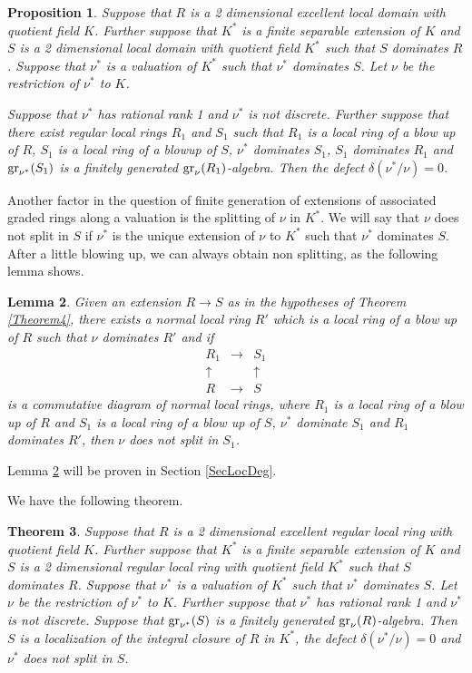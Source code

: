 \documentclass[11pt]{amsart}
\newtheorem{Theorem}{Theorem}[section]
\newtheorem{Lemma}[Theorem]{Lemma}
\newtheorem{Proposition}[Theorem]{Proposition}
\begin{document}
\begin{Proposition}\label{Prop1} 
Suppose that $R$ is a 2 dimensional excellent local domain with quotient field $K$. Further suppose that $K^*$ is a finite separable extension of $K$ and $S$ is a 2 dimensional local domain with quotient field
$K^*$ such that  $S$ dominates $R$. 
Suppose that $\nu^*$ is a valuation of $K^*$ such that 
 $\nu^*$ dominates $S$. Let $\nu$ be the restriction of $\nu^*$ to $K$. 
 
 Suppose that  $\nu^*$ has rational rank 1 and $\nu^*$ is not discrete. Further suppose that 
  there exist regular local rings $R_1$ and $S_1$ such that
 $R_1$ is a local ring of a blow up of $R$, $S_1$ is a local ring of a blowup of $S$, $\nu^*$ dominates $S_1$, $S_1$ dominates $R_1$ and ${\rm gr}_{\nu^*}(S_1)$ is a finitely generated ${\rm gr}_{\nu}(R_1)$-algebra.
Then the defect $\delta(\nu^*/\nu)=0$.
\end{Proposition}

Another factor in the question of finite generation of extensions of associated graded rings along a valuation is the splitting of $\nu$ in $K^*$. We will say that $\nu$ does not split in $S$ if $\nu^*$ is the unique extension of $\nu$ to $K^*$ such that $\nu^*$ dominates $S$.  After a little blowing up, we can always obtain non splitting, as the following lemma shows.

\begin{Lemma}\label{LemmaN66} Given an extension $R\rightarrow S$ as in the hypotheses  of Theorem \ref{Theorem4},  there exists a normal local ring $R'$ which is a local ring of a blow up of $R$ such that $\nu$ dominates $R'$ and if 
$$
\begin{array}{lll}
R_1&\rightarrow&S_1\\
\uparrow&&\uparrow\\
R&\rightarrow&S
\end{array}
$$
is a commutative diagram of normal local rings, where $R_1$ is a local ring of a blow up of $R$ and $S_1$ is a local ring of a blow up of $S$, $\nu^*$ dominate $S_1$ and $R_1$ dominates $R'$,  then $\nu$ does not split in $S_1$.
\end{Lemma}
Lemma \ref{LemmaN66} will be proven in Section \ref{SecLocDeg}.

We have the following theorem.

\begin{Theorem}\label{ThmN2}    Suppose that $R$ is a 2 dimensional excellent regular local ring with quotient field $K$. Further suppose that $K^*$ is a finite separable extension of $K$ and $S$ is a 2 dimensional regular local ring with quotient field
$K^*$ such that  $S$ dominates $R$. 
Suppose that $\nu^*$ is a valuation of $K^*$ such that 
 $\nu^*$ dominates $S$. Let $\nu$ be the restriction of $\nu^*$ to $K$.        Further suppose that $\nu^*$ has rational rank 1 and $\nu^*$ is not discrete. Suppose that ${\rm gr}_{\nu^*}(S)$ is a finitely generated ${\rm gr}_{\nu}(R)$-algebra. Then $S$ is a localization of the integral closure of $R$ in $K^*$, the defect $\delta(\nu^*/\nu)=0$ and $\nu^*$ does not split in $S$.  
\end{Theorem}
\end{document}
